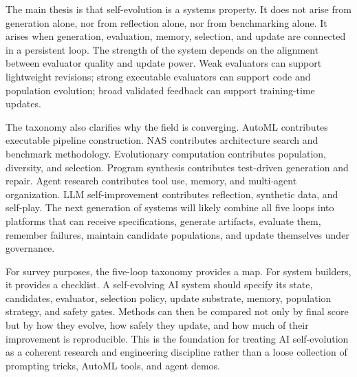 The main thesis is that self-evolution is a systems property.  It does not arise from generation alone, nor from reflection alone, nor from benchmarking alone.  It arises when generation, evaluation, memory, selection, and update are connected in a persistent loop.  The strength of the system depends on the alignment between evaluator quality and update power.  Weak evaluators can support lightweight revisions; strong executable evaluators can support code and population evolution; broad validated feedback can support training-time updates.

The taxonomy also clarifies why the field is converging.  AutoML contributes executable pipeline construction.  NAS contributes architecture search and benchmark methodology.  Evolutionary computation contributes population, diversity, and selection.  Program synthesis contributes test-driven generation and repair.  Agent research contributes tool use, memory, and multi-agent organization.  LLM self-improvement contributes reflection, synthetic data, and self-play.  The next generation of systems will likely combine all five loops into platforms that can receive specifications, generate artifacts, evaluate them, remember failures, maintain candidate populations, and update themselves under governance.

For survey purposes, the five-loop taxonomy provides a map.  For system builders, it provides a checklist.  A self-evolving AI system should specify its state, candidates, evaluator, selection policy, update substrate, memory, population strategy, and safety gates.  Methods can then be compared not only by final score but by how they evolve, how safely they update, and how much of their improvement is reproducible.  This is the foundation for treating AI self-evolution as a coherent research and engineering discipline rather than a loose collection of prompting tricks, AutoML tools, and agent demos.
